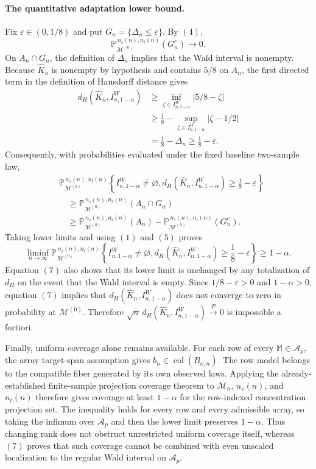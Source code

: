 \paragraph{The quantitative adaptation lower bound.}
Fix \(\varepsilon\in(0,1/8)\) and put \(G_n=\{\Delta_n\le\varepsilon\}\). By \((4)\),
\[
\mathbb P_{\mathcal M^{(0)}}^{\,n_s(n),n_t(n)}(G_n^c)\longrightarrow0. \tag{5}
\]
On \(A_n\cap G_n\), the definition of \(\Delta_n\) implies that the Wald interval is nonempty. Because \(\widehat K_n\) is nonempty by hypothesis and contains \(5/8\) on \(A_n\), the first directed term in the definition of Hausdorff distance gives
\[
\begin{split}
d_H(\widehat K_n,I^W_{n,1-\alpha})
&\ge\inf_{\zeta\in I^W_{n,1-\alpha}}|5/8-\zeta|\\
&\ge\frac18-
\sup_{\zeta\in I^W_{n,1-\alpha}}|\zeta-1/2|\\
&=\frac18-\Delta_n
\ge\frac18-\varepsilon. \tag{6}
\end{split}
\]
Consequently, with probabilities evaluated under the fixed baseline two-sample law,
\[
\begin{split}
&\mathbb P_{\mathcal M^{(0)}}^{\,n_s(n),n_t(n)}
\left\{I^W_{n,1-\alpha}\ne\varnothing,
d_H(\widehat K_n,I^W_{n,1-\alpha})\ge\frac18-\varepsilon\right\}\\
&\quad\ge \mathbb P_{\mathcal M^{(0)}}^{\,n_s(n),n_t(n)}(A_n\cap G_n)\\
&\quad\ge \mathbb P_{\mathcal M^{(0)}}^{\,n_s(n),n_t(n)}(A_n)
-\mathbb P_{\mathcal M^{(0)}}^{\,n_s(n),n_t(n)}(G_n^c).
\end{split}
\]
Taking lower limits and using \((1)\) and \((5)\) proves
\[
\liminf_{n\to\infty}
\mathbb P_{\mathcal M^{(0)}}^{\,n_s(n),n_t(n)}
\left\{I^W_{n,1-\alpha}\ne\varnothing,
d_H(\widehat K_n,I^W_{n,1-\alpha})\ge\frac18-\varepsilon\right\}
\ge1-\alpha. \tag{7}
\]
Equation \((7)\) also shows that its lower limit is unchanged by any totalization of \(d_H\) on the event that the Wald interval is empty. Since \(1/8-\varepsilon>0\) and \(1-\alpha>0\), equation \((7)\) implies that \(d_H(\widehat K_n,I^W_{n,1-\alpha})\) does not converge to zero in probability at \(\mathcal M^{(0)}\). Therefore \(\sqrt n\,d_H(\widehat K_n,I^W_{n,1-\alpha})\xrightarrow{P}0\) is impossible a fortiori.

Finally, uniform coverage alone remains available. For each row of every \(\mathbb M\in\mathcal A_p\), the array target-span assumption gives \(b_n\in\operatorname{col}(B_{x,n})\). The row model belongs to the compatible fiber generated by its own observed laws. Applying the already-established finite-sample projection coverage theorem to \(\mathcal M_n\), \(n_s(n)\), and \(n_t(n)\) therefore gives coverage at least \(1-\alpha\) for the row-indexed concentration projection set. The inequality holds for every row and every admissible array, so taking the infimum over \(\mathcal A_p\) and then the lower limit preserves \(1-\alpha\). Thus changing rank does not obstruct unrestricted uniform coverage itself, whereas \((7)\) proves that such coverage cannot be combined with even unscaled localization to the regular Wald interval on \(\mathcal A_p\).